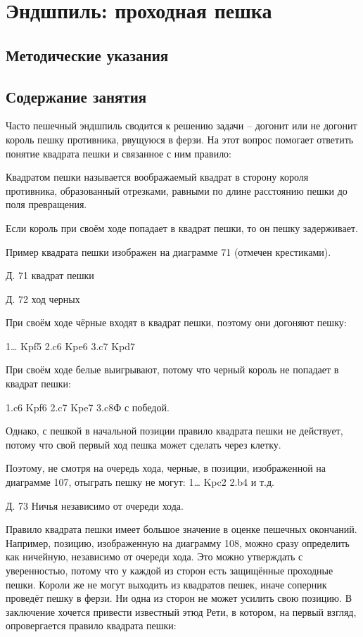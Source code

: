 \chapter{Эндшпиль: проходная пешка}

\section{Методические указания}


\section{Содержание занятия}

Часто пешечный эндшпиль сводится к решению задачи – догонит или не догонит король пешку противника, рвущуюся в ферзи. На этот вопрос помогает ответить понятие квадрата пешки и связанное с ним правило:

Квадратом пешки называется воображаемый квадрат в сторону короля противника, образованный отрезками, равными по длине расстоянию пешки до поля превращения. 

Если король при своём ходе попадает в квадрат пешки, то он пешку задерживает.

Пример квадрата пешки изображен на диаграмме 71 (отмечен крестиками).
 
 
Д. 71 квадрат пешки
 
Д. 72 ход черных
 
При своём ходе чёрные входят в квадрат пешки, поэтому они догоняют пешку:

1… Kpf5 2.c6 Kpe6 3.c7 Kpd7

При своём ходе белые выигрывают, потому что черный король не попадает в квадрат пешки:

1.c6 Kpf6 2.c7 Kpe7 3.c8Ф с победой.

Однако, с пешкой в начальной позиции правило квадрата пешки не действует, потому что свой первый ход пешка может сделать через клетку.

Поэтому, не смотря на очередь хода, черные, в позиции, изображенной на диаграмме 107, отыграть пешку не могут: 1… Kpc2 2.b4 и т.д.
 
Д. 73 Ничья независимо от очереди хода.

Правило квадрата пешки имеет большое значение в оценке пешечных окончаний. Например, позицию, изображенную на диаграмму 108, можно сразу определить как ничейную, независимо от очереди хода. Это можно утверждать с уверенностью, потому что у каждой из сторон есть защищённые проходные пешки. Короли же не могут выходить из квадратов пешек, иначе соперник проведёт пешку в ферзи. Ни одна из сторон не может усилить свою позицию.
В заключение хочется привести известный этюд Рети, в котором, на первый взгляд, опровергается правило квадрата пешки:

